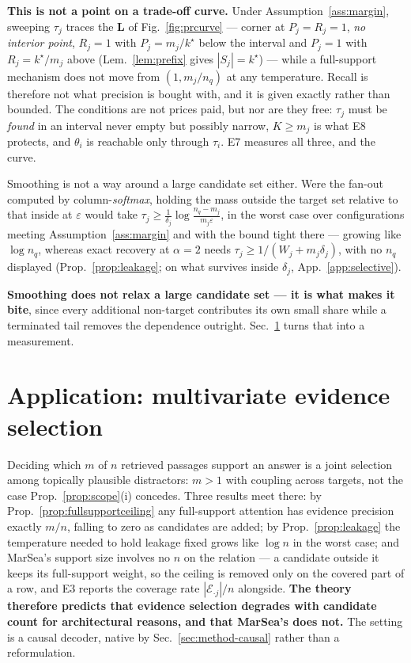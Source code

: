 \documentclass{article}
\begin{document}
\textbf{This is not a point on a trade-off curve.} Under Assumption~\ref{ass:margin}, sweeping
$\tau_j$ traces the \textbf{L} of Fig.~\ref{fig:prcurve} --- corner at $P_j=R_j=1$, \emph{no
interior point}, $R_j=1$ with $P_j=m_j/k^\star$ below the interval and $P_j=1$ with
$R_j=k^\star/m_j$ above (Lem.~\ref{lem:prefix} gives $|S_j|=k^\star$) --- while a full-support
mechanism does not move from $(1,m_j/n_q)$ at any temperature. Recall is therefore not what
precision is bought with, and it is given exactly rather than bounded. The conditions are not
prices paid, but nor are they free: $\tau_j$ must be \emph{found} in an interval never empty but
possibly narrow, $K\ge m_j$ is what E8 protects, and $\theta_i$ is reachable only through
$\tau_i$. E7 measures all three, and the curve.

Smoothing is not a way around a large candidate set either. Were the fan-out computed by
column-\emph{softmax}, holding the mass outside the target set relative to that inside at
$\varepsilon$ would take $\tau_j\ge\frac{1}{\delta_j}\log\frac{n_q-m_j}{m_j\varepsilon}$, in the
worst case over configurations meeting Assumption~\ref{ass:margin} and with the bound tight there
--- growing like $\log n_q$, whereas exact recovery at $\alpha=2$ needs
$\tau_j\ge1/(W_j+m_j\delta_j)$, with no $n_q$ displayed (Prop.~\ref{prop:leakage}; on what
survives inside $\delta_j$, App.~\ref{app:selective}).

\textbf{Smoothing does not relax a large candidate set --- it is what makes it bite}, since every
additional non-target contributes its own small share while a terminated tail removes the
dependence outright. Sec.~\ref{sec:apps} turns that into a measurement.

\section{Application: multivariate evidence selection}
\label{sec:apps}

Deciding which $m$ of $n$ retrieved passages support an answer is a joint selection among
topically plausible distractors: $m>1$ with coupling across targets, not the case
Prop.~\ref{prop:scope}(i) concedes. Three results meet there: by
Prop.~\ref{prop:fullsupportceiling} any full-support attention has evidence precision exactly
$m/n$, falling to zero as candidates are added; by Prop.~\ref{prop:leakage} the temperature
needed to hold leakage fixed grows like $\log n$ in the worst case; and MarSea's support size
involves no $n$ on the relation --- a candidate outside it keeps its full-support weight, so the
ceiling is removed only on the covered part of a row, and E3 reports the coverage rate
$|\mathcal{E}_{\cdot j}|/n$ alongside.
\textbf{The theory therefore predicts that evidence selection degrades with candidate count for
architectural reasons, and that MarSea's does not.} The setting is a causal decoder, native by
Sec.~\ref{sec:method-causal} rather than a reformulation.
\end{document}

